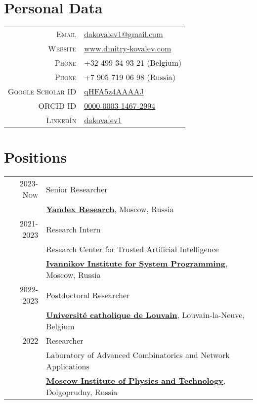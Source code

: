 \section{Personal Data}

\begin{tabular}{rl}
	\textsc{Email} & \href{mailto:dakovalev1@gmail.com}{dakovalev1@gmail.com}\\
	\textsc{Website} & \href{https://www.dmitry-kovalev.com}{www.dmitry-kovalev.com}\\
	\textsc{Phone} &  +32 499 34 93 21 (Belgium)\\
	\textsc{Phone} & +7 905 719 06 98 (Russia)\\
	\textsc{Google Scholar ID} &\href{https://scholar.google.com/citations?user=qHFA5z4AAAAJ}{qHFA5z4AAAAJ}\\
	\textsc{ORCID ID} & \href{https://orcid.org/0000-0003-1467-2994}{0000-0003-1467-2994}\\
	\textsc{LinkedIn} & \href{https://www.linkedin.com/in/dakovalev1/}{dakovalev1}

\end{tabular}



\section{Positions}
\begin{tabular}{rl}	
	\textsc{2023-Now}& Senior Researcher\\
	&\textbf{\href{https://research.yandex.com}{\color{black}Yandex Research}}, Moscow, Russia\\
	\textsc{2021-2023}& Research Intern\\
	&Research Center for Trusted Artificial Intelligence\\
	&\textbf{\href{https://www.ispras.ru/en/}{\color{black}Ivannikov Institute for System Programming}}, Moscow, Russia\\
	\textsc{2022-2023}& Postdoctoral Researcher\\
	& \textbf{\href{https://uclouvain.be/en/index.html}{\color{black}Université catholique de Louvain}}, Louvain-la-Neuve, Belgium\\
	\textsc{2022}& Researcher\\
	&Laboratory of Advanced Combinatorics and Network Applications\\
	&\textbf{\href{https://mipt.ru/}{\color{black}Moscow Institute of Physics and Technology}}, Dolgoprudny, Russia
\end{tabular}


